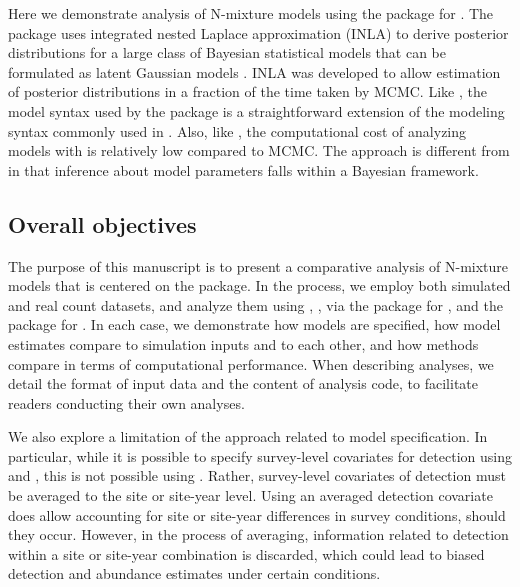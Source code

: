 \documentclass[codesnippet]{jss}
\begin{document}
Here we demonstrate analysis of N-mixture models using the  
package   
\citep{Rue_Riebler_Sorbye_Illian_Simpson_Lindgren_2017} for . 
The  package uses integrated nested Laplace approximation (INLA) 
to derive posterior distributions for a large class of Bayesian statistical 
models that can be formulated as latent Gaussian models 
\citep{Rue_Martino_Chopin_2009, Lindgren_Rue_Lindstrom_2011}. INLA was 
developed to allow estimation of posterior distributions in a fraction of 
the time taken by MCMC. Like , the model syntax used by the 
 package is a straightforward extension of the modeling syntax 
commonly used in . Also, like , the computational 
cost of analyzing models with  is relatively low compared to 
MCMC. The  approach is different from  in that 
inference about model parameters falls within a Bayesian framework.

\subsection[Overall objectives]{Overall objectives}
The purpose of this manuscript is to present a comparative analysis of N-mixture models that is centered on the  package. In the process, we employ both simulated and real count datasets, and analyze them using , , via the  package \citep{Denwood_2016} for , and the  package for . In each case, we demonstrate how models are specified, how model estimates compare to simulation inputs and to each other, and how methods compare in terms of computational performance. When describing  analyses, we detail the format of input data and the content of analysis code, to facilitate readers conducting their own analyses.

We also explore a limitation of the  approach related to model specification. In particular, while it is possible to specify survey-level covariates for detection using  and , this is not possible using . Rather, survey-level covariates of detection must be averaged to the site or site-year level. Using an averaged detection covariate does allow accounting for site or site-year differences in survey conditions, should they occur. However, in the process of averaging, information related to detection within a site or site-year combination is discarded, which could lead to biased detection and abundance estimates under certain conditions.
\end{document}
